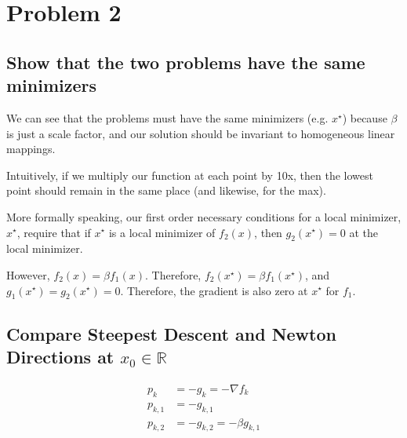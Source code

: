 \documentclass{article}
\begin{document}




\section{Problem 2}

\subsection{Show that the two problems have the same minimizers}

We can see that the problems must have the same minimizers
(e.g. $x^\star$) because $\beta$ is just a scale factor, and our solution
should be invariant to homogeneous linear mappings. 

Intuitively, if we multiply our function at each point by 10x, then 
the lowest point should remain in the same place (and likewise, for the
max). 

More formally speaking, our first order necessary conditions for a local
minimizer, $x^\star$, require that if $x^\star$ is a local minimizer of
$f_2(x)$, then $g_2(x^\star) = 0 $ at the local minimizer. 

However, $f_2(x) = \beta f_1(x)$. Therefore,  $f_2(x^\star) = \beta
f_1(x^\star)$, and $g_1(x^\star) = g_2(x^\star) = 0 $. Therefore, the
gradient is also zero at $x^\star$ for $f_1$.

\subsection{Compare Steepest Descent and Newton Directions at $x_0 \in \mathbb{R}$}

\begin{align*}
 p_k&=-g_k = -\nabla f_k\\
 p_{k,1}&=-g_{k,1}\\
 p_{k,2}&=-g_{k,2} = -\beta g_{k,1}
\end{align*}
\end{document}
